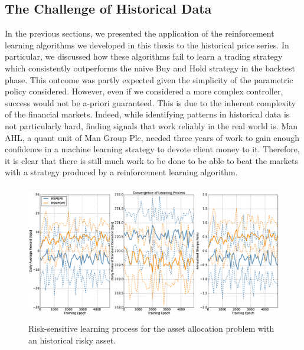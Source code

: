 \subsection{The Challenge of Historical Data}
In the previous sections, we presented the application of the reinforcement learning algorithms we developed in this thesis to the historical price series. In particular, we discussed how these algorithms fail to learn a trading strategy which consistently outperforms the naive Buy and Hold strategy in the backtest phase. This outcome was partly expected given the simplicity of the parametric policy considered. However, even if we considered a more complex controller, success would not be a-priori guaranteed. This is due to the inherent complexity of the financial markets. Indeed, while identifying patterns in historical data is not particularly hard, finding signals that work reliably in the real world is. Man AHL, a quant unit of Man Group Plc, needed three years of work to gain enough confidence in a machine learning strategy to devote client money to it. Therefore, it is clear that there is still much work to be done to be able to beat the markets with a strategy produced by a reinforcement learning algorithm. 

\begin{figure}[t!]
	\centering
	\includegraphics[height=6cm,width=1.0\textwidth]{Images/8_10_single_hist_sensitive_convergence}
	\caption[Risk-sensitive learning process for the historical risky asset]{Risk-sensitive learning process for the asset allocation problem with an historical risky asset.}
	\label{fig:8_10_rs_learning_process_historical}
\end{figure}

